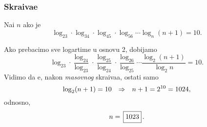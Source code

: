 \subsubsection{Skra{\cc}iva{\nj}e}

\zadatak Na{\dj}i $n$ ako je
$$
\log_23\cdot\log_34\cdot\log_45\cdot\log_56\cdots\log_n(n+1)=10.
$$

\resenje
Ako prebacimo sve logartime u osnovu 2, dobijamo
$$
\log_23
\cdot\frac{\log_24}{\log_23}
\cdot\frac{\log_25}{\log_24}
\cdot\frac{\log_26}{\log_25}
\cdots\frac{\log_2(n+1)}{\log_2n}=10.
$$
Vidimo da {\cc}e, nakon {\sl masovnog\/} skra{\cc}iva{\nj}a, ostati samo
$$
\log_2(n+1)=10{\quad\Rightarrow\quad} n+1 = 2^{10}=1024,
$$
odnosno,
$$
n=\ram{1023}.
$$

